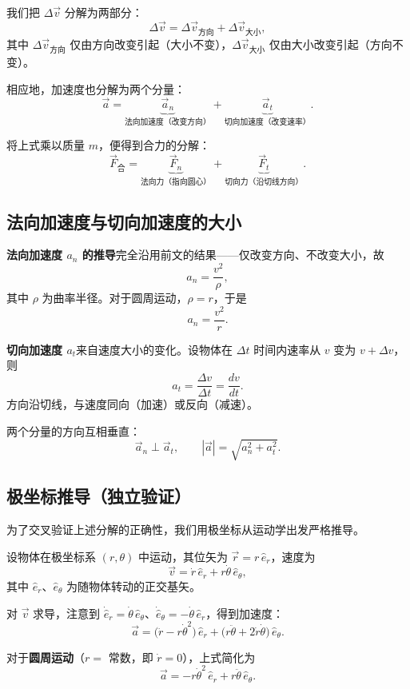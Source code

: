 \documentclass[12pt,a4paper]{article}
\begin{document}
我们把 $\Delta\vec{v}$ 分解为两部分：
\[
\Delta\vec{v} = \Delta\vec{v}_{\text{方向}} + \Delta\vec{v}_{\text{大小}},
\]
其中 $\Delta\vec{v}_{\text{方向}}$ 仅由方向改变引起（大小不变），$\Delta\vec{v}_{\text{大小}}$ 仅由大小改变引起（方向不变）。

相应地，加速度也分解为两个分量：
\[
\vec{a} = \underbrace{\vec{a}_n}_{\text{法向加速度（改变方向）}}
        + \underbrace{\vec{a}_t}_{\text{切向加速度（改变速率）}}.
\]

将上式乘以质量 $m$，便得到合力的分解：
\[
\vec{F}_{\text{合}} = \underbrace{\vec{F}_n}_{\text{法向力（指向圆心）}}
                   + \underbrace{\vec{F}_t}_{\text{切向力（沿切线方向）}}.
\]

\subsection{法向加速度与切向加速度的大小}

\textbf{法向加速度 $a_n$ 的推导}完全沿用前文的结果——仅改变方向、不改变大小，故
\[
a_n = \frac{v^2}{\rho},
\]
其中 $\rho$ 为曲率半径。对于圆周运动，$\rho = r$，于是
\[
a_n = \frac{v^2}{r}.
\]

\textbf{切向加速度 $a_t$}来自速度大小的变化。设物体在 $\Delta t$ 时间内速率从 $v$ 变为 $v+\Delta v$，则
\[
a_t = \frac{\Delta v}{\Delta t} = \frac{dv}{dt}.
\]
方向沿切线，与速度同向（加速）或反向（减速）。

两个分量的方向互相垂直：
\[
\vec{a}_n \perp \vec{a}_t,\qquad |\vec{a}| = \sqrt{a_n^2 + a_t^2}.
\]

\subsection{极坐标推导（独立验证）}

为了交叉验证上述分解的正确性，我们用极坐标从运动学出发严格推导。

设物体在极坐标系 $(r,\theta)$ 中运动，其位矢为 $\vec{r}=r\,\hat{e}_r$，速度为
\[
\vec{v} = \dot{r}\,\hat{e}_r + r\dot{\theta}\,\hat{e}_\theta,
\]
其中 $\hat{e}_r$、$\hat{e}_\theta$ 为随物体转动的正交基矢。

对 $\vec{v}$ 求导，注意到 $\dot{\hat{e}}_r = \dot{\theta}\,\hat{e}_\theta$、$\dot{\hat{e}}_\theta = -\dot{\theta}\,\hat{e}_r$，得到加速度：
\[
\vec{a} = \bigl(\ddot{r} - r\dot{\theta}^2\bigr)\,\hat{e}_r
        + \bigl(r\ddot{\theta} + 2\dot{r}\dot{\theta}\bigr)\,\hat{e}_\theta.
\]

对于\textbf{圆周运动}（$r=$ 常数，即 $\dot{r}=0$），上式简化为
\[
\boxed{\vec{a} = -r\dot{\theta}^2\,\hat{e}_r + r\ddot{\theta}\,\hat{e}_\theta}.
\]
\end{document}

